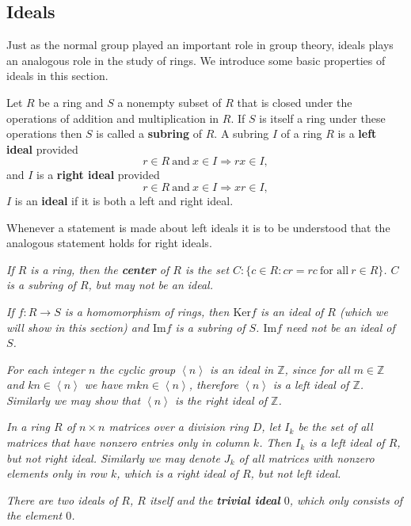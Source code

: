 \subsection{Ideals}
Just as the normal group played an important role in group theory, ideals plays an analogous role in the study of rings. We introduce some basic properties of ideals in this section.
\begin{definition}
Let $R$ be a ring and $S$ a nonempty subset of $R$ that is closed under the operations of addition and multiplication in $R$. If $S$ is itself a ring under these operations then $S$ is called a \textbf{subring} of $R$. A subring $I$ of a ring $R$ is a \textbf{left ideal} provided 
$$r\in R\ \text{and}\ x\in I\Rightarrow rx\in I,$$
and $I$ is a \textbf{right ideal} provided 
$$r\in R\ \text{and}\ x\in I\Rightarrow xr\in I,$$
$I$ is an \textbf{ideal} if it is both a left and right ideal.
\end{definition}
Whenever a statement is made about left ideals it is to be understood that the analogous statement holds for right ideals.
\begin{example}\em
If $R$ is a ring, then the \textbf{center} of $R$ is the set $C:\{c\in R:cr=rc\ \text{for all}\ r\in R\}$. $C$ is a subring of $R$, but may not be an ideal.
\end{example}
\begin{example}\em
If $f:R\to S$ is a homomorphism of rings, then $\mathrm{Ker}f$ is an ideal of $R$ (which we will show in this section) and $\mathrm{Im}f$ is a subring of $S$. $\mathrm{Im}f$ need not be an ideal of $S$.
\end{example}
\begin{example}\em
For each integer $n$ the cyclic group $\left<n\right>$ is an ideal in $\mathbb{Z}$, since for all $m\in\mathbb{Z}$ and $kn\in\left<n\right>$ we have $mkn\in\left<n\right>$, therefore $\left<n\right>$ is a left ideal of $\mathbb{Z}$. Similarly we may show that $\left<n\right>$ is the right ideal of $\mathbb{Z}$.
\end{example}
\begin{example}\em
In a ring $R$ of $n\times n$ matrices over a division ring $D$, let $I_k$ be the set of all matrices that have nonzero entries only in column $k$. Then $I_k$ is a left ideal of $R$, but not right ideal. Similarly we may denote $J_k$ of all matrices with nonzero elements only in row $k$, which is a right ideal of $R$, but not left ideal.
\end{example}
\begin{example}\em
There are two ideals of $R$, $R$ itself and the \textbf{trivial ideal} $0$, which only consists of the element $0$.
\end{example}

